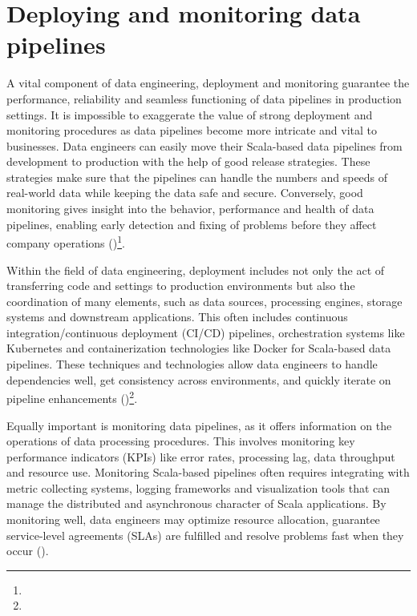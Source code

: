 \chapter{Deploying and monitoring data pipelines}

A vital component of data engineering, deployment and monitoring guarantee the performance, reliability and seamless functioning of data pipelines in production settings. It is impossible to exaggerate the value of strong deployment and monitoring procedures as data pipelines become more intricate and vital to businesses. Data engineers can easily move their Scala-based data pipelines from development to production with the help of good release strategies. These strategies make sure that the pipelines can handle the numbers and speeds of real-world data while keeping the data safe and secure. Conversely, good monitoring gives insight into the behavior, performance and health of data pipelines, enabling early detection and fixing of problems before they affect company operations  (\cite{tomeDataEngineeringScala2024})\footnote[10]{}.

Within the field of data engineering, deployment includes not only the act of transferring code and settings to production environments but also the coordination of many elements, such as data sources, processing engines, storage systems and downstream applications. This often includes continuous integration/continuous deployment (CI/CD) pipelines, orchestration systems like Kubernetes and containerization technologies like Docker for Scala-based data pipelines. These techniques and technologies allow data engineers to handle dependencies well, get consistency across environments, and quickly iterate on pipeline enhancements (\cite{Humble2010ContinuousDR})\footnote[46]{}.

Equally important is monitoring data pipelines, as it offers information on the operations of data processing procedures. This involves monitoring key performance indicators (KPIs) like error rates, processing lag, data throughput and resource use. Monitoring Scala-based pipelines often requires integrating with metric collecting systems, logging frameworks and visualization tools that can manage the distributed and asynchronous character of Scala applications. By monitoring well, data engineers may optimize resource allocation, guarantee service-level agreements (SLAs) are fulfilled and resolve problems fast when they occur  (\cite{tomeDataEngineeringScala2024})\footnotemark[10].

